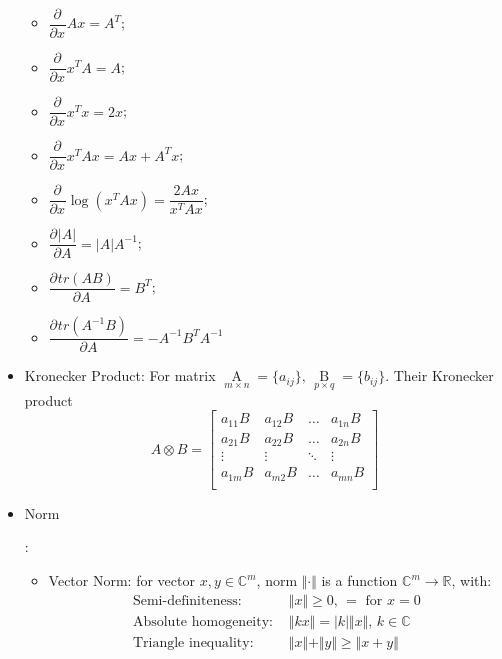 \begin{itemize}[topsep=6pt,itemsep=4pt]
{        }
        \begin{itemize}[topsep=6pt,itemsep=2pt]
            \item $ \dfrac{\partial^{} }{\partial x^{}}Ax=A^T $;\\
            \item $ \dfrac{\partial^{} }{\partial x^{}}x^TA=A $;\\
            \item $ \dfrac{\partial^{} }{\partial x^{}}x^Tx=2x $;\\
            \item $ \dfrac{\partial^{} }{\partial x^{}}x^TAx=Ax+A^Tx $;\\
            \item $ \dfrac{\partial^{} }{\partial x^{}}\log(x^TAx)=\dfrac{2Ax}{x^TAx} $;\\
            \item $ \dfrac{\partial^{} |A|}{\partial A^{}}=|A|A^{-1} $;\\
            \item $ \dfrac{\partial^{} tr(AB)}{\partial A^{}}=B^T $;\\
            \item $ \dfrac{\partial^{} tr(A^{-1}B)}{\partial A^{}}=-A^{-1}B^TA^{-1} $
        \end{itemize}
          
        
        \item Kronecker Product: For matrix $ \mathop{A}\limits_{m\times n}=\{a_{ij}\},\,\mathop{B}\limits_{p\times q}=\{b_{ij}\} $. Their Kronecker product
        \begin{equation}
            A\otimes B=\begin{bmatrix}
            a_{11}B&a_{12}B&\ldots&a_{1n}B \\
            a_{21}B&a_{22}B&\ldots&a_{2n}B \\
            \vdots&\vdots&\ddots&\vdots\\
            a_{1m}B&a_{m2}B&\ldots&a_{mn}B \\
            \end{bmatrix} 
        \end{equation}

        \item \hypertarget{NormDefinition}{Norm}: 
        \begin{itemize}[topsep=2pt,itemsep=0pt]
            \item Vector Norm: for vector $ x,y\in \mathbb{C}^m $, norm $ \Vert \cdot \Vert  $ is a function $ \mathbb{C}^m\to \mathbb{R} $, with:
            \begin{align}
                \text{Semi-definiteness: }&\Vert x \Vert \geq 0,\, =\text{ for }x=0\\
                \text{Absolute homogeneity: }&\Vert kx \Vert = |k|\Vert x \Vert,\, k\in \mathbb{C} \\
                \text{Triangle inequality: }& \Vert x \Vert + \Vert y \Vert \geq \Vert x+y \Vert 
            \end{align}
        

\end{itemize}
\end{itemize}
